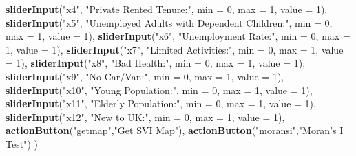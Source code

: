 \documentclass[]{article}
\newenvironment{Shaded}{\begin{snugshade}}{\end{snugshade}}
\newcommand{\KeywordTok}[1]{\textcolor[rgb]{0.13,0.29,0.53}{\textbf{#1}}}
\newcommand{\DataTypeTok}[1]{\textcolor[rgb]{0.13,0.29,0.53}{#1}}
\newcommand{\DecValTok}[1]{\textcolor[rgb]{0.00,0.00,0.81}{#1}}
\newcommand{\StringTok}[1]{\textcolor[rgb]{0.31,0.60,0.02}{#1}}
\newcommand{\NormalTok}[1]{#1}
\begin{document}
\begin{Shaded}
\begin{Highlighting}[]
             \KeywordTok{sliderInput}\NormalTok{(}\StringTok{"x4"}\NormalTok{, }\StringTok{"Private Rented Tenure:"}\NormalTok{,}
                         \DataTypeTok{min =} \DecValTok{0}\NormalTok{, }\DataTypeTok{max =} \DecValTok{1}\NormalTok{,}
                         \DataTypeTok{value =} \DecValTok{1}\NormalTok{),}
             \KeywordTok{sliderInput}\NormalTok{(}\StringTok{"x5"}\NormalTok{, }\StringTok{"Unemployed Adults with Dependent Children:"}\NormalTok{,}
                         \DataTypeTok{min =} \DecValTok{0}\NormalTok{, }\DataTypeTok{max =} \DecValTok{1}\NormalTok{,}
                         \DataTypeTok{value =} \DecValTok{1}\NormalTok{),}
             \KeywordTok{sliderInput}\NormalTok{(}\StringTok{"x6"}\NormalTok{, }\StringTok{"Unemployment Rate:"}\NormalTok{,}
                         \DataTypeTok{min =} \DecValTok{0}\NormalTok{, }\DataTypeTok{max =} \DecValTok{1}\NormalTok{,}
                         \DataTypeTok{value =} \DecValTok{1}\NormalTok{),}
             \KeywordTok{sliderInput}\NormalTok{(}\StringTok{"x7"}\NormalTok{, }\StringTok{"Limited Activities:"}\NormalTok{,}
                         \DataTypeTok{min =} \DecValTok{0}\NormalTok{, }\DataTypeTok{max =} \DecValTok{1}\NormalTok{,}
                         \DataTypeTok{value =} \DecValTok{1}\NormalTok{),}
             \KeywordTok{sliderInput}\NormalTok{(}\StringTok{"x8"}\NormalTok{, }\StringTok{"Bad Health:"}\NormalTok{,}
                         \DataTypeTok{min =} \DecValTok{0}\NormalTok{, }\DataTypeTok{max =} \DecValTok{1}\NormalTok{,}
                         \DataTypeTok{value =} \DecValTok{1}\NormalTok{),}
             \KeywordTok{sliderInput}\NormalTok{(}\StringTok{"x9"}\NormalTok{, }\StringTok{"No Car/Van:"}\NormalTok{,}
                         \DataTypeTok{min =} \DecValTok{0}\NormalTok{, }\DataTypeTok{max =} \DecValTok{1}\NormalTok{,}
                         \DataTypeTok{value =} \DecValTok{1}\NormalTok{),}
             \KeywordTok{sliderInput}\NormalTok{(}\StringTok{"x10"}\NormalTok{, }\StringTok{"Young Population:"}\NormalTok{,}
                         \DataTypeTok{min =} \DecValTok{0}\NormalTok{, }\DataTypeTok{max =} \DecValTok{1}\NormalTok{,}
                         \DataTypeTok{value =} \DecValTok{1}\NormalTok{),}
             \KeywordTok{sliderInput}\NormalTok{(}\StringTok{"x11"}\NormalTok{, }\StringTok{"Elderly Population:"}\NormalTok{,}
                         \DataTypeTok{min =} \DecValTok{0}\NormalTok{, }\DataTypeTok{max =} \DecValTok{1}\NormalTok{,}
                         \DataTypeTok{value =} \DecValTok{1}\NormalTok{),}
             \KeywordTok{sliderInput}\NormalTok{(}\StringTok{"x12"}\NormalTok{, }\StringTok{"New to UK:"}\NormalTok{,}
                         \DataTypeTok{min =} \DecValTok{0}\NormalTok{, }\DataTypeTok{max =} \DecValTok{1}\NormalTok{,}
                         \DataTypeTok{value =} \DecValTok{1}\NormalTok{),}
             \KeywordTok{actionButton}\NormalTok{(}\StringTok{"getmap"}\NormalTok{,}\StringTok{"Get SVI Map"}\NormalTok{),}
             \KeywordTok{actionButton}\NormalTok{(}\StringTok{"moransi"}\NormalTok{,}\StringTok{"Moran's I Test"}\NormalTok{)}
\NormalTok{  )}
  

\end{Highlighting}
\end{Shaded}
\end{document}
